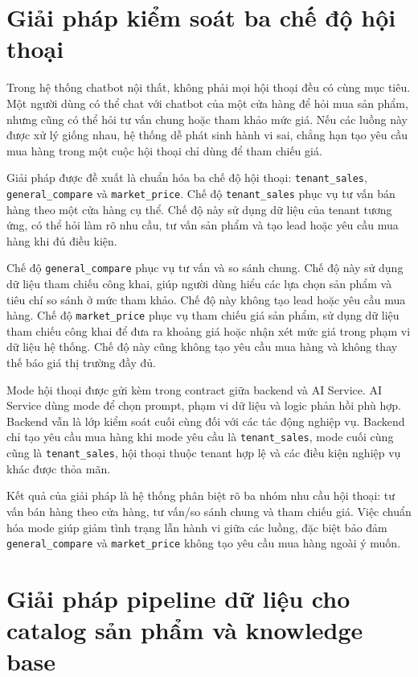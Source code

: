 \documentclass[../DoAn.tex]{subfiles}
\begin{document}
\section{Giải pháp kiểm soát ba chế độ hội thoại}
\label{section:5.3}

Trong hệ thống chatbot nội thất, không phải mọi hội thoại đều có cùng mục tiêu. Một người dùng có thể chat với chatbot của một cửa hàng để hỏi mua sản phẩm, nhưng cũng có thể hỏi tư vấn chung hoặc tham khảo mức giá. Nếu các luồng này được xử lý giống nhau, hệ thống dễ phát sinh hành vi sai, chẳng hạn tạo yêu cầu mua hàng trong một cuộc hội thoại chỉ dùng để tham chiếu giá.

Giải pháp được đề xuất là chuẩn hóa ba chế độ hội thoại: \texttt{tenant\_sales}, \texttt{general\_compare} và \texttt{market\_price}. Chế độ \texttt{tenant\_sales} phục vụ tư vấn bán hàng theo một cửa hàng cụ thể. Chế độ này sử dụng dữ liệu của tenant tương ứng, có thể hỏi làm rõ nhu cầu, tư vấn sản phẩm và tạo lead hoặc yêu cầu mua hàng khi đủ điều kiện.

Chế độ \texttt{general\_compare} phục vụ tư vấn và so sánh chung. Chế độ này sử dụng dữ liệu tham chiếu công khai, giúp người dùng hiểu các lựa chọn sản phẩm và tiêu chí so sánh ở mức tham khảo. Chế độ này không tạo lead hoặc yêu cầu mua hàng. Chế độ \texttt{market\_price} phục vụ tham chiếu giá sản phẩm, sử dụng dữ liệu tham chiếu công khai để đưa ra khoảng giá hoặc nhận xét mức giá trong phạm vi dữ liệu hệ thống. Chế độ này cũng không tạo yêu cầu mua hàng và không thay thế báo giá thị trường đầy đủ.

Mode hội thoại được gửi kèm trong contract giữa backend và AI Service. AI Service dùng mode để chọn prompt, phạm vi dữ liệu và logic phản hồi phù hợp. Backend vẫn là lớp kiểm soát cuối cùng đối với các tác động nghiệp vụ. Backend chỉ tạo yêu cầu mua hàng khi mode yêu cầu là \texttt{tenant\_sales}, mode cuối cùng cũng là \texttt{tenant\_sales}, hội thoại thuộc tenant hợp lệ và các điều kiện nghiệp vụ khác được thỏa mãn.

Kết quả của giải pháp là hệ thống phân biệt rõ ba nhóm nhu cầu hội thoại: tư vấn bán hàng theo cửa hàng, tư vấn/so sánh chung và tham chiếu giá. Việc chuẩn hóa mode giúp giảm tình trạng lẫn hành vi giữa các luồng, đặc biệt bảo đảm \texttt{general\_compare} và \texttt{market\_price} không tạo yêu cầu mua hàng ngoài ý muốn.

\section{Giải pháp pipeline dữ liệu cho catalog sản phẩm và knowledge base}
\label{section:5.4}
\end{document}
